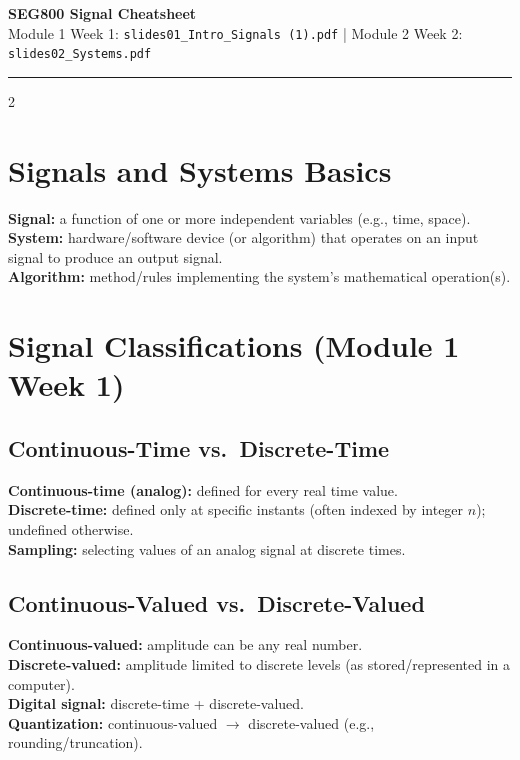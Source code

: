 \documentclass[10pt]{article}
\begin{document}
{\Large \textbf{SEG800 Signal Cheatsheet}}\\
{\small Module 1 Week 1: \texttt{slides01\_Intro\_Signals (1).pdf} \quad | \quad Module 2 Week 2: \texttt{slides02\_Systems.pdf}}

\vspace{0.25em}
\hrule
\vspace{0.5em}

\footnotesize
\begin{multicols}{2}

\section{Signals and Systems Basics}

\textbf{Signal:} a function of one or more independent variables (e.g., time, space).\\
\textbf{System:} hardware/software device (or algorithm) that operates on an input signal to produce an output signal.\\
\textbf{Algorithm:} method/rules implementing the system's mathematical operation(s).

\section{Signal Classifications (Module 1 Week 1)}

\subsection{Continuous-Time vs.\ Discrete-Time}
\textbf{Continuous-time (analog):} defined for every real time value.\\
\textbf{Discrete-time:} defined only at specific instants (often indexed by integer $n$); undefined otherwise.\\
\textbf{Sampling:} selecting values of an analog signal at discrete times.

\subsection{Continuous-Valued vs.\ Discrete-Valued}
\textbf{Continuous-valued:} amplitude can be any real number.\\
\textbf{Discrete-valued:} amplitude limited to discrete levels (as stored/represented in a computer).\\
\textbf{Digital signal:} discrete-time + discrete-valued.\\
\textbf{Quantization:} continuous-valued $\rightarrow$ discrete-valued (e.g., rounding/truncation).


\end{multicols}
\end{document}
